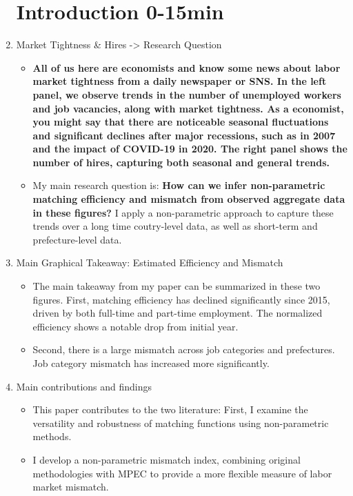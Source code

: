 \documentclass[12pt]{article}
\begin{document}
\begin{enumerate}
\section{Introduction 0-15min}
    \item Market Tightness \& Hires -> Research Question
    \begin{itemize}
        \item \textbf{All of us here are economists and know some news about labor market tightness from a daily newspaper or SNS. In the left panel, we observe trends in the number of unemployed workers and job vacancies, along with market tightness. As a economist, you might say that there are noticeable seasonal fluctuations and significant declines after major recessions, such as in 2007 and the impact of COVID-19 in 2020. The right panel shows the number of hires, capturing both seasonal and general trends.}
        \item My main research question is: \textbf{How can we infer non-parametric matching efficiency and mismatch from observed aggregate data in these figures?} I apply a non-parametric approach to capture these trends over a long time coutry-level data, as well as short-term and prefecture-level data.
    \end{itemize}
    \item Main Graphical Takeaway: Estimated Efficiency and Mismatch
    \begin{itemize}
        \item The main takeaway from my paper can be summarized in these two figures. First, matching efficiency has declined significantly since 2015, driven by both full-time and part-time employment. The normalized efficiency shows a notable drop from initial year.
        \item Second, there is a large mismatch across job categories and prefectures. Job category mismatch has increased more significantly.
    \end{itemize}
    \item Main contributions and findings
    \begin{itemize}
        \item This paper contributes to the two literature:
        First, I examine the versatility and robustness of matching functions using non-parametric methods.
        \item I develop a non-parametric mismatch index, combining original methodologies with MPEC to provide a more flexible measure of labor market mismatch.

\end{itemize}
\end{enumerate}
\end{document}
